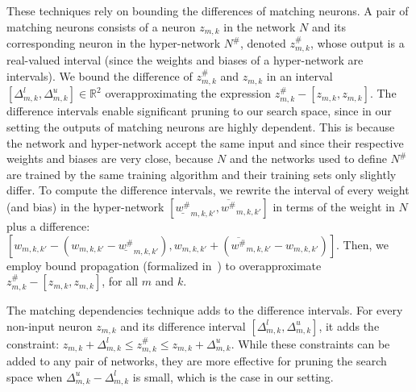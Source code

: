 These techniques rely on bounding the differences of matching neurons. A pair of matching neurons consists of a neuron $z_{m,k}$ in the network $N$ and its corresponding neuron in the hyper-network $N^\#$, denoted $z_{m,k}^\#$, whose output is a real-valued interval (since the weights and biases of a hyper-network are intervals).
We bound the difference of $z^\#_{m,k}$ and $z_{m,k}$ in an interval $[\Delta^l_{m,k},\Delta^u_{m,k}]\in \mathbb{R}^2$ overapproximating the expression $z^\#_{m,k}-[z_{m,k},z_{m,k}]$.
The difference intervals enable significant pruning to our search space, since in our setting the outputs of matching neurons are highly dependent. This is because the network and hyper-network accept the same input and since their respective weights and biases are very close, because $N$ and the networks used to define $N^\#$ are trained by the same training algorithm and their training sets only slightly differ. 
To compute the difference intervals, we rewrite the interval of every weight (and bias) in the hyper-network $[\underline{w^\#}_{m,k,k'},\overline{w^\#}_{m,k,k'}]$ in terms of the weight in $N$ plus a difference: $[w_{m,k,k'}- (w_{m,k,k'}-\underline{w^\#}_{m,k,k'}), w_{m,k,k'}+{(\overline{w^\#}_{m,k,k'}-w_{m,k,k'})}]$. 
Then, we employ bound propagation %
(formalized in~) to overapproximate $z^\#_{m,k}-[z_{m,k},z_{m,k}]$, for all $m$ and $k$. 

The matching dependencies technique adds to %
 the difference intervals.
For every non-input neuron $z_{m,k}$ and its difference interval $[\Delta^l_{m,k},\Delta^u_{m,k}]$, it adds the constraint: 
$z_{m,k} + \Delta^l_{m,k} \leq z^\#_{m,k} \leq z_{m,k} + \Delta^u_{m,k}$.
While these constraints can be added to any pair of networks, they are more effective for pruning the search space when $\Delta^u_{m,k}-\Delta^l_{m,k}$ is small, which is the case in our setting.
 
